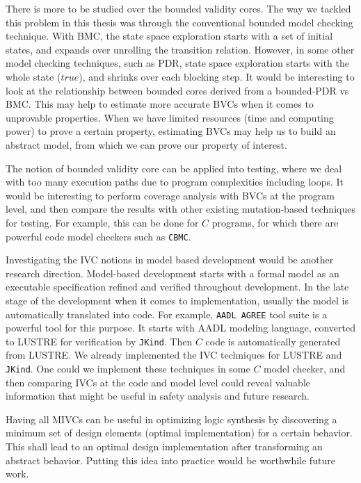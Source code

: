 There is more to be studied over the bounded validity cores. The way we tackled this problem in this thesis was through the conventional bounded model checking technique. With BMC, the state space exploration starts with a set of initial states, and expands over unrolling the transition relation. However, in some other model checking techniques, such as PDR, state space exploration starts with the whole state ($true$), and shrinks over each blocking step. It would be interesting to look at the relationship between bounded cores derived from a bounded-PDR vs BMC. This may help to estimate more accurate BVCs when it comes to unprovable properties. When we have limited resources (time and computing power) to prove a certain property, estimating BVCs may help us to build an abstract model, from which we can prove our property of interest.

The notion of bounded validity core can be applied into testing, where we deal with too many execution paths due to program complexities including loops. It would be interesting to perform coverage analysis with BVCs at the program level, and then compare the results with other existing mutation-based techniques for testing. For example, this can be done for $C$ programs, for which there are powerful code model checkers such as \texttt{CBMC}. 

Investigating the IVC notions in model based development would be another research direction. Model-based development starts with a formal model as an executable specification refined and verified throughout development. In the late stage of the development when it comes to implementation, usually the model is automatically translated into code. For example,  \texttt{AADL AGREE} tool suite is a powerful tool for this purpose. It starts with AADL modeling language, converted to LUSTRE for verification by \texttt{JKind}. Then $C$ code is automatically generated from LUSTRE. We already implemented the IVC techniques for LUSTRE and \texttt{JKind}. One could we implement these techniques in some $C$ model checker, and then comparing IVCs at the code and model level could reveal valuable information that might be useful in safety analysis and future research.

Having all MIVCs can be useful in optimizing logic synthesis by discovering a minimum set of design elements (optimal implementation) for a certain behavior. This shall lead to an optimal design implementation after transforming an abstract behavior. Putting this idea into practice would be worthwhile future work.

